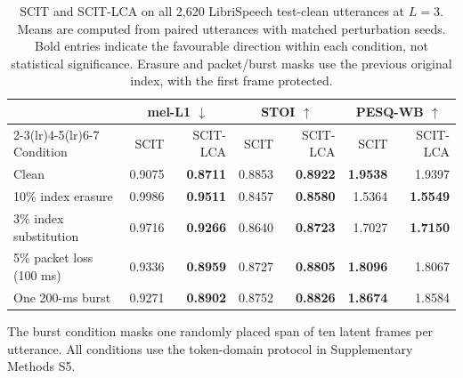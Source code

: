 \begin{table}[t]
\centering
\caption{SCIT and SCIT-LCA on all 2,620 LibriSpeech test-clean utterances at $L=3$. Means are computed from paired utterances with matched perturbation seeds. Bold entries indicate the favourable direction within each condition, not statistical significance. Erasure and packet/burst masks use the previous original index, with the first frame protected.}
\label{tab:rv3-robustness}
\small\setlength{\tabcolsep}{6pt}
\begin{tabular}{lrrrrrr}
\toprule
& \multicolumn{2}{c}{mel-L1 $\downarrow$} & \multicolumn{2}{c}{STOI $\uparrow$} & \multicolumn{2}{c}{PESQ-WB $\uparrow$}\\
\cmidrule(lr){2-3}\cmidrule(lr){4-5}\cmidrule(lr){6-7}
Condition & SCIT & SCIT-LCA & SCIT & SCIT-LCA & SCIT & SCIT-LCA\\
\midrule
Clean & 0.9075 & \textbf{0.8711} & 0.8853 & \textbf{0.8922} & \textbf{1.9538} & 1.9397\\
10\% index erasure & 0.9986 & \textbf{0.9511} & 0.8457 & \textbf{0.8580} & 1.5364 & \textbf{1.5549}\\
3\% index substitution & 0.9716 & \textbf{0.9266} & 0.8640 & \textbf{0.8723} & 1.7027 & \textbf{1.7150}\\
5\% packet loss (100 ms) & 0.9336 & \textbf{0.8959} & 0.8727 & \textbf{0.8805} & \textbf{1.8096} & 1.8067\\
One 200-ms burst & 0.9271 & \textbf{0.8902} & 0.8752 & \textbf{0.8826} & \textbf{1.8674} & 1.8584\\
\bottomrule
\end{tabular}
\par\smallskip
\parbox{\textwidth}{\footnotesize The burst condition masks one randomly placed span of ten latent frames per utterance. All conditions use the token-domain protocol in Supplementary Methods S5.}
\end{table}
